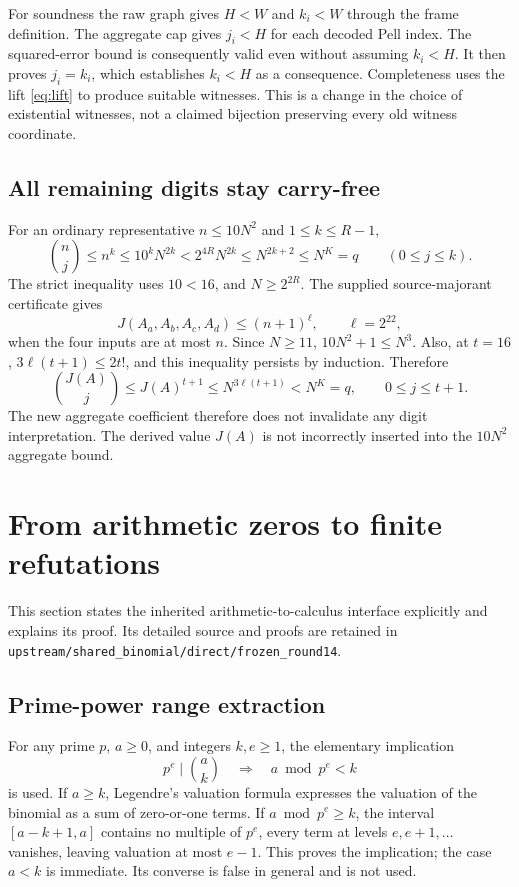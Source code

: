 \documentclass[11pt,a4paper]{article}
\theoremstyle{remark}
\newcommand{\qref}[1]{\nolinkurl{#1}}
\begin{document}
For soundness the raw graph gives \(H<W\) and \(k_i<W\) through the
frame definition. The aggregate cap gives \(j_i<H\) for each decoded
Pell index. The squared-error bound is consequently valid even without
assuming \(k_i<H\). It then proves \(j_i=k_i\), which establishes
\(k_i<H\) as a consequence. Completeness uses the lift
\eqref{eq:lift} to produce suitable witnesses. This is a change in the
choice of existential witnesses, not a claimed bijection preserving every
old witness coordinate.

\subsection{All remaining digits stay carry-free}

For an ordinary representative \(n\le10N^2\) and
\(1\le k\le R-1\),
\[
 \binom nj\le n^k\le10^kN^{2k}
 <2^{4R}N^{2k}\le N^{2k+2}\le N^K=q
 \qquad(0\le j\le k).
\]
The strict inequality uses \(10<16\), and \(N\ge2^{2R}\).
The supplied source-majorant certificate gives
\[
 J(A_a,A_b,A_c,A_d)\le(n+1)^\ell,
 \qquad \ell=2^{22},
\]
when the four inputs are at most \(n\). Since \(N\ge11\),
\(10N^2+1\le N^3\). Also, at \(t=16\),
\(3\ell(t+1)\le2t!\), and this inequality persists by induction.
Therefore
\[
 \binom{J(A)}j\le J(A)^{t+1}
 \le N^{3\ell(t+1)}<N^K=q,
 \qquad 0\le j\le t+1.
\]
The new aggregate coefficient therefore does not invalidate any digit
interpretation. The derived value \(J(A)\) is not incorrectly inserted
into the \(10N^2\) aggregate bound.

\section{From arithmetic zeros to finite refutations}

This section states the inherited arithmetic-to-calculus interface explicitly
and explains its proof. Its detailed source and proofs are retained in
\qref{upstream/shared_binomial/direct/frozen_round14}.

\subsection{Prime-power range extraction}

For any prime \(p\), \(a\ge0\), and integers \(k,e\ge1\), the elementary implication
\[
 p^e\mid\binom ak\quad\Longrightarrow\quad a\bmod p^e<k
\]
is used. If \(a\ge k\), Legendre's valuation formula expresses the
valuation of the binomial as a sum of zero-or-one terms. If \(a\bmod p^e\ge k\), the interval
\([a-k+1,a]\) contains no multiple of \(p^e\), every term at levels
\(e,e+1,\ldots\) vanishes, leaving valuation at most \(e-1\).
This proves the implication; the case \(a<k\) is immediate.
Its converse is false in general and is not used.
\end{document}

